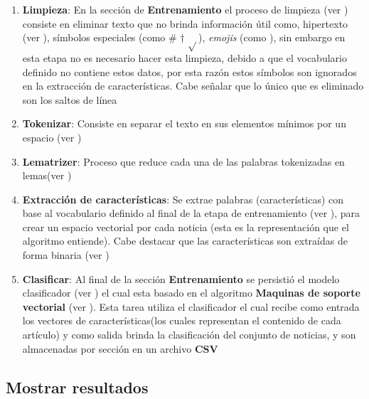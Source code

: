 \begin{enumerate}

	\item \textbf{Limpieza}: En la sección de \textbf{Entrenamiento} el proceso de limpieza (ver ) consiste en eliminar texto que no brinda información útil como, hipertexto (ver ), símbolos especiales (como \# $\dagger$ $\sqrt{ }$), \textit{emojis} (como \dSmiley \dCooley \dNinja), sin embargo en esta etapa no es necesario hacer esta limpieza, debido a que el vocabulario definido no contiene estos datos, por esta razón estos símbolos son ignorados en la extracción de características. Cabe señalar que lo único que es eliminado son los saltos de línea

	\item \textbf{Tokenizar}: Consiste en separar el texto en sus elementos mínimos por un espacio (ver )

	\item \textbf{Lematrizer}: Proceso que reduce cada una de las palabras tokenizadas en lemas(ver )

	\item \textbf{Extracción de características}: Se extrae palabras (características) con base al vocabulario definido al final de la etapa de entrenamiento (ver ), para crear un espacio vectorial por cada noticia (esta es la representación que el algoritmo entiende). Cabe destacar que las características son extraídas de forma binaria (ver )

	\item \textbf{Clasificar}: Al final de la sección \textbf{Entrenamiento} se persistió el modelo clasificador (ver ) el cual esta basado en el algoritmo \textbf{Maquinas de soporte vectorial} (ver ). Esta tarea utiliza el clasificador el cual recibe como entrada los vectores de características(los cuales representan el contenido de cada artículo) y como salida brinda la clasificación del conjunto de noticias, y son almacenadas por sección en un archivo \textbf{CSV}

\end{enumerate}


\subsection{Mostrar resultados}

